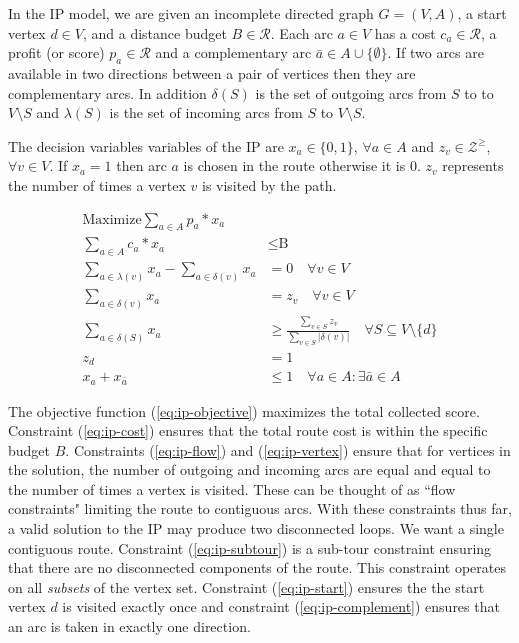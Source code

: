 \documentclass[honors]{union-cs-thesis}
\newcommand{\RR}{\mathcal{R}} %
\newcommand{\ZZ}{\mathcal{Z}} %
\newcommand{\set}[1]{\ensuremath{\{{#1}\}}} %
\newcommand{\sse}{\subseteq} %
\begin{document}
In the IP model, we are given an incomplete directed graph $G = (V,A)$, a start vertex $d \in V$, and a distance budget $B \in \RR$. Each arc $a \in V$ has a cost $c_a \in \RR$, a profit (or score) $p_a \in \RR$ and a complementary arc $\bar{a} \in A \cup \set{\emptyset}$. If two arcs are available in two directions between a pair of vertices then they are complementary arcs. In addition $\delta(S)$ is the set of outgoing arcs from $S$ to to $V \setminus S$ and $\lambda(S)$ is the set of incoming arcs from $S$ to $V \setminus S$.

The decision variables variables of the IP are $x_a \in \set{0,1}$, $\forall a \in A$ and $z_v \in \ZZ^{\geq}$, $\forall v \in V$. If $x_a = 1$ then arc $a$ is chosen in the route otherwise it is 0. $z_v$ represents the number of times a vertex $v$ is visited by the path.

\begin{align}
\text{Maximize} \sum_{a \in A}{p_a * x_a} &\label{eq:ip-objective}\\  
\sum_{a \in A}{c_a * x_a} &\leq \text{B} \label{eq:ip-cost}\\
\sum_{a \in \lambda(v)}{x_a}  -\sum_{a \in \delta(v)}{x_a} &= 0 \quad \forall v \in V\label{eq:ip-flow}\\
\sum_{a \in \delta(v)}{x_a} &= z_v \quad\forall v \in V \label{eq:ip-vertex}\\
\sum_{a \in \delta(S)}{x_a} &\geq \frac{\sum_{v \in S}{z_v}}{\sum_{v \in S}{|\delta(v)|}} \quad \forall S \sse V \setminus \set{d} \label{eq:ip-subtour}\\
z_d &= 1\label{eq:ip-start}\\
x_a + x_{\bar{a}} &\leq 1 \quad \forall a \in A: \exists\bar{a} \in A\label{eq:ip-complement}
\end{align}

The objective function (\ref{eq:ip-objective}) maximizes the total collected score. Constraint (\ref{eq:ip-cost}) ensures that the total route cost is within the specific budget $B$. Constraints (\ref{eq:ip-flow}) and (\ref{eq:ip-vertex}) ensure that for vertices in the solution, the number of outgoing and incoming arcs are equal and equal to the number of times a vertex is visited. These can be thought of as ``flow constraints" limiting the route to contiguous arcs. With these constraints thus far, a valid solution to the IP may produce two disconnected loops. We want a single contiguous route. Constraint (\ref{eq:ip-subtour}) is a sub-tour constraint ensuring that there are no disconnected components of the route. This constraint operates on all \emph{subsets} of the vertex set. Constraint (\ref{eq:ip-start}) ensures the the start vertex $d$ is visited exactly once and constraint (\ref{eq:ip-complement}) ensures that an arc is taken in exactly one direction.
 
\end{document}

